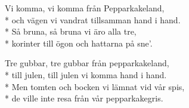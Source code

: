 \begin{SongText}
    \begin{SongVerse}
        Vi komma, vi komma från Pepparkakeland,\\*%
        och vägen vi vandrat tillsamman hand i hand.\\*%
        Så bruna, så bruna vi äro alla tre,\\*%
        korinter till ögon och hattarna på sne’.
    \end{SongVerse}
    \begin{SongVerse}
        Tre gubbar, tre gubbar från pepparkakeland,\\*%
        till julen, till julen vi komma hand i hand.\\*%
        Men tomten och bocken vi lämnat vid vår spis,\\*%
        de ville inte resa från vår pepparkakegris.
    \end{SongVerse}
    \begin{SongVerse}
    \end{SongVerse}
\end{SongText}